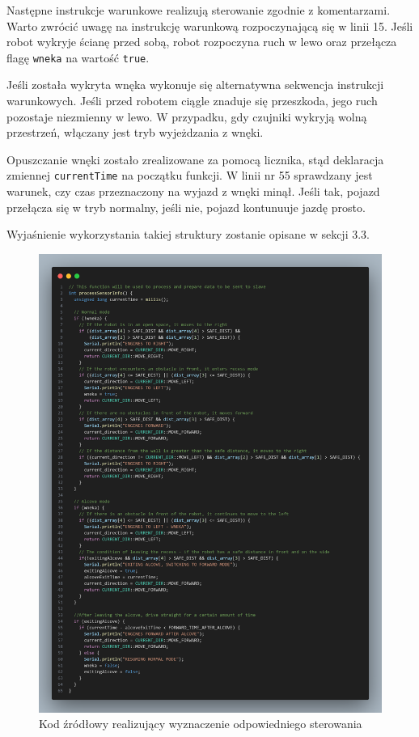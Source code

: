 \documentclass{report}
\begin{document}
Następne instrukcje warunkowe realizują sterowanie zgodnie z komentarzami. Warto zwrócić uwagę na instrukcję warunkową rozpoczynającą się w linii 15. Jeśli robot wykryje ścianę przed sobą, robot rozpoczyna ruch w lewo oraz przełącza flagę \texttt{wneka} na wartość \texttt{true}.

Jeśli została wykryta wnęka wykonuje się alternatywna sekwencja instrukcji warunkowych. Jeśli przed robotem ciągle znaduje się przeszkoda, jego ruch pozostaje niezmienny w lewo. W przypadku, gdy czujniki wykryją wolną przestrzeń, włączany jest tryb wyjeżdzania z wnęki. 

Opuszczanie wnęki zostało zrealizowane za pomocą licznika, stąd deklaracja zmiennej \texttt{currentTime} na początku funkcji. W linii nr 55 sprawdzany jest warunek, czy czas przeznaczony na wyjazd z wnęki minął. Jeśli tak, pojazd przełącza się w tryb normalny, jeśli nie, pojazd kontunuuje jazdę prosto. 

Wyjaśnienie wykorzystania takiej struktury zostanie opisane w sekcji 3.3. 

\begin{figure}[H]
    \centering
    \includegraphics[width=1.0\textwidth]{src/code_snaps/processInfo.png}
    \caption{Kod źródłowy realizujący wyznaczenie odpowiedniego sterowania}
\end{figure}
\end{document}
